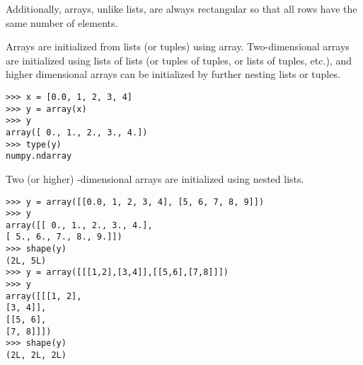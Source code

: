 \documentclass[KSmain.tex]{subfiles}
\begin{document}

Additionally, arrays, unlike lists, are always rectangular so that all rows have the same
number of elements.

Arrays are initialized from lists (or tuples) using array. Two-dimensional arrays are initialized using
lists of lists (or tuples of tuples, or lists of tuples, etc.), and higher dimensional arrays can be initialized by
further nesting lists or tuples.

\begin{framed}
\begin{verbatim}
>>> x = [0.0, 1, 2, 3, 4]
>>> y = array(x)
>>> y
array([ 0., 1., 2., 3., 4.])
>>> type(y)
numpy.ndarray
\end{verbatim}
\end{framed}
Two (or higher) -dimensional arrays are initialized using nested lists.
\begin{framed}
\begin{verbatim}
>>> y = array([[0.0, 1, 2, 3, 4], [5, 6, 7, 8, 9]])
>>> y
array([[ 0., 1., 2., 3., 4.],
[ 5., 6., 7., 8., 9.]])
>>> shape(y)
(2L, 5L)
>>> y = array([[[1,2],[3,4]],[[5,6],[7,8]]])
>>> y
array([[[1, 2],
[3, 4]],
[[5, 6],
[7, 8]]])
>>> shape(y)
(2L, 2L, 2L)
\end{verbatim}
\end{framed}
\end{document}
